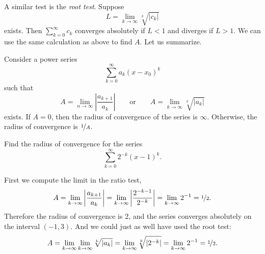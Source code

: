 \documentclass{ximera}
\begin{document}
A similar test is the \emph{root test}. Suppose
\begin{equation*}
    L = \lim_{k\to\infty} \sqrt[k]{\lvert c_k \rvert}
\end{equation*}
exists.  Then $\sum_{k=0}^\infty c_k$ converges absolutely if $L < 1$ and diverges if $L > 1$.  We can use the same calculation as above to find $A$. Let us summarize.

\begin{theorem}
    Consider a power series
    \begin{equation*}
        \sum_{k=0}^\infty a_k {(x-x_0)}^k
    \end{equation*}
    such that
    \begin{equation*}
        A = \lim_{n\to\infty} \left \lvert \frac{a_{k+1}}{a_k} \right \rvert 
        \qquad \text{or} \qquad 
        A = \lim_{k\to\infty} \sqrt[k]{\lvert a_k \rvert}
    \end{equation*}
    exists. If $A = 0$, then the radius of convergence of the series is $\infty$.  Otherwise, the radius of convergence is $\nicefrac{1}{A}$.
\end{theorem}

\begin{example}
    Find the radius of convergence for the series
    \begin{equation*}
        \sum_{k=0}^\infty 2^{-k} {(x-1)}^k .
    \end{equation*}
\end{example}

\begin{exampleSol}
    First we compute the limit in the ratio test,
    \begin{equation*}
    A = \lim_{k\to\infty} \left \lvert \frac{a_{k+1}}{a_k} \right \rvert
    =\lim_{k\to\infty} \left \lvert \frac{2^{-k-1}}{2^{-k}} \right \rvert
    = \lim_{k\to\infty} 2^{-1} = \nicefrac{1}{2}.
    \end{equation*}
    Therefore the radius of convergence is $2$, and the series converges absolutely on the interval $(-1,3)$. And we could just as well have used the root test:
    \begin{equation*}
        A = \lim_{k\to\infty} \lim_{k\to\infty} \sqrt[k]{\lvert a_k \rvert} 
        = \lim_{k\to\infty} \sqrt[k]{\lvert 2^{-k} \rvert} 
        = \lim_{k\to\infty} 2^{-1} = \nicefrac{1}{2}.
    \end{equation*}
\end{exampleSol}
\end{document}

